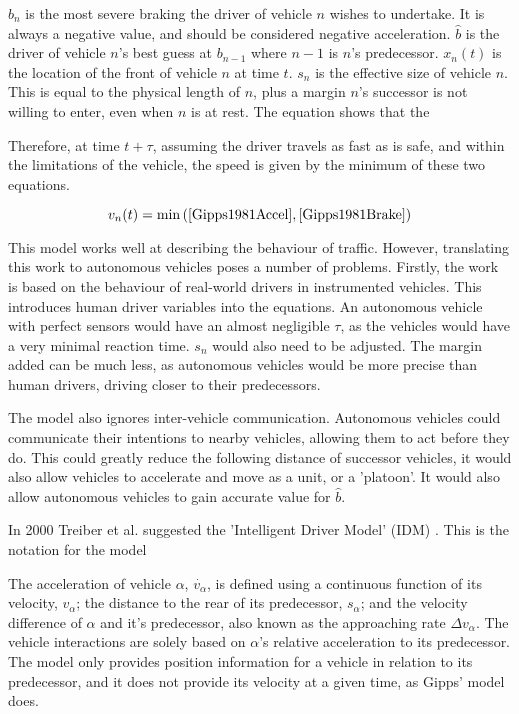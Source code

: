 $b_n$ is the most severe braking the driver of vehicle $n$ wishes to undertake. It is always a negative value, and should be considered negative acceleration. $\hat{b}$ is the driver of vehicle $n$'s best guess at $b_{n-1}$ where $n-1$ is $n$'s predecessor. $x_n(t)$ is the location of the front of vehicle $n$ at time $t$. $s_n$ is the effective size of vehicle $n$. This is equal to the physical length of $n$, plus a margin $n$'s successor is not willing to enter, even when $n$ is at rest. The equation shows that the  

Therefore, at time $t + \tau$, assuming the driver travels as fast as is safe, and within the limitations of the vehicle, the speed is given by the minimum of these two equations.

\begin{equation}
v_n(t) = \min{(\eqref{Gipps1981Accel},\eqref{Gipps1981Brake})}
\end{equation}

This model works well at describing the behaviour of traffic. However, translating this work to autonomous vehicles poses a number of problems. Firstly, the work is based on the behaviour of real-world drivers in instrumented vehicles. This introduces human driver variables into the equations. An autonomous vehicle with perfect sensors would have an almost negligible $\tau$, as the vehicles would have a very minimal reaction time. $s_n$ would also need to be adjusted. The margin added can be much less, as autonomous vehicles would be more precise than human drivers, driving closer to their predecessors. 

The model also ignores inter-vehicle communication. Autonomous vehicles could communicate their intentions to nearby vehicles, allowing them to act before they do. This could greatly reduce the following distance of successor vehicles, it would also allow vehicles to accelerate and move as a unit, or a 'platoon'. It would also allow autonomous vehicles to gain accurate value for $\hat{b}$.

In 2000 Treiber et al. suggested the 'Intelligent Driver Model' (IDM) \citep{Treiber2000}. This is the notation for the model

The acceleration of vehicle $\alpha$, $\dot{v_\alpha}$, is defined using a continuous function of its velocity, $v_\alpha$; the distance to the rear of its predecessor, $s_\alpha$; and the velocity difference of $\alpha$ and it's predecessor, also known as the approaching rate $\Delta v_\alpha$. The vehicle interactions are solely based on $\alpha$'s relative acceleration to its predecessor. The model only provides position information for a vehicle in relation to its predecessor, and it does not provide its velocity at a given time, as Gipps' model does. 

